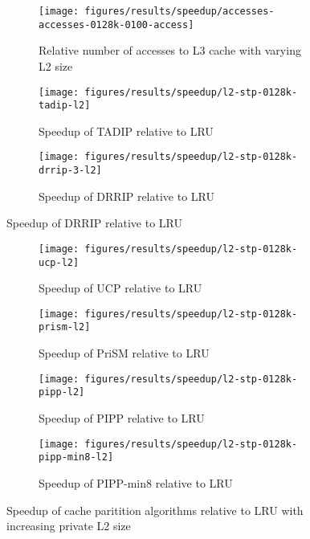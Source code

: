 \begin{figure}[H]
    \centering
    \begin{subfigure}[b]{0.5\textwidth}
        \texttt{[image: figures/results/speedup/accesses-accesses-0128k-0100-access]}
        \caption{Relative number of accesses to L3 cache with varying L2 size}
        \label{fig:results:l2:access}
    \end{subfigure}
    \begin{subfigure}[b]{0.5\textwidth}
        \texttt{[image: figures/results/speedup/l2-stp-0128k-tadip-l2]}
        \caption{Speedup of TADIP relative to LRU}
        \label{fig:results:l2:tadip}
    \end{subfigure}%
    \begin{subfigure}[b]{0.5\textwidth}
        \texttt{[image: figures/results/speedup/l2-stp-0128k-drrip-3-l2]}
        \caption{Speedup of DRRIP relative to LRU}
        \label{fig:results:l2:drrip}
    \end{subfigure}
\end{figure}
\clearpage
\begin{figure}[H]
    \ContinuedFloat
    \begin{subfigure}[b]{0.5\textwidth}
        \texttt{[image: figures/results/speedup/l2-stp-0128k-ucp-l2]}
        \caption{Speedup of UCP relative to LRU}
        \label{fig:results:l2:ucp}
    \end{subfigure}%
    \begin{subfigure}[b]{0.5\textwidth}
        \texttt{[image: figures/results/speedup/l2-stp-0128k-prism-l2]}
        \caption{Speedup of PriSM relative to LRU}
        \label{fig:results:l2:prism}
    \end{subfigure}
    \begin{subfigure}[b]{0.5\textwidth}
        \texttt{[image: figures/results/speedup/l2-stp-0128k-pipp-l2]}
        \caption{Speedup of PIPP relative to LRU}
        \label{fig:results:l2:pipp}
    \end{subfigure}%
    \begin{subfigure}[b]{0.5\textwidth}
        \texttt{[image: figures/results/speedup/l2-stp-0128k-pipp-min8-l2]}
        \caption{Speedup of PIPP-min8 relative to LRU}
        \label{fig:results:l2:pipp-min8}
    \end{subfigure}
    \caption{Speedup of cache paritition algorithms relative to LRU with increasing private L2 size}
    \label{fig:results:l2}
\end{figure}
